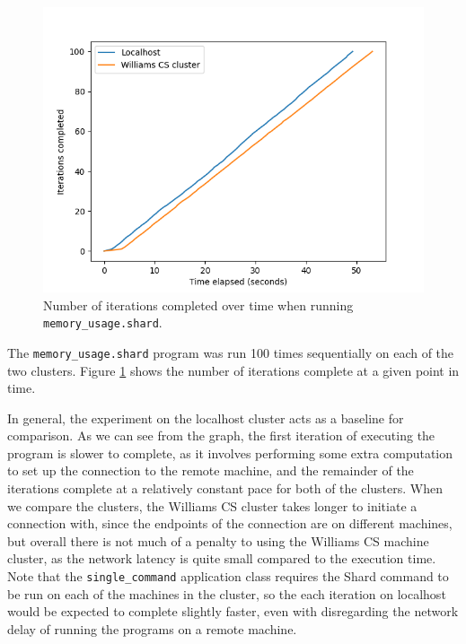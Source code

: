 \documentclass[oneside]{report}
\begin{document}
\begin{figure}[h]
  \begin{center}
    \includegraphics[scale=0.9]{img/experiments/e1_1620966966721.png}
    \caption{Number of iterations completed over time when running \texttt{memory\_usage.shard}.}
    \label{fig:memoryusage}
  \end{center}
\end{figure}

The \texttt{memory\_usage.shard} program was run 100 times sequentially on each of the two clusters.
Figure \ref{fig:memoryusage} shows the number of iterations complete at a given point in time.

In general, the experiment on the localhost cluster acts as a baseline for comparison.
As we can see from the graph, the first iteration of executing the program is slower to complete, as it involves performing some extra computation to set up the connection to the remote machine, and the remainder of the iterations complete at a relatively constant pace for both of the clusters.
When we compare the clusters, the Williams CS cluster takes longer to initiate a connection with, since the endpoints of the connection are on different machines, but overall there is not much of a penalty to using the Williams CS machine cluster, as the network latency is quite small compared to the execution time.
Note that the \texttt{single\_command} application class requires the Shard command to be run on each of the machines in the cluster, so the each iteration on localhost would be expected to complete slightly faster, even with disregarding the network delay of running the programs on a remote machine.
\end{document}
